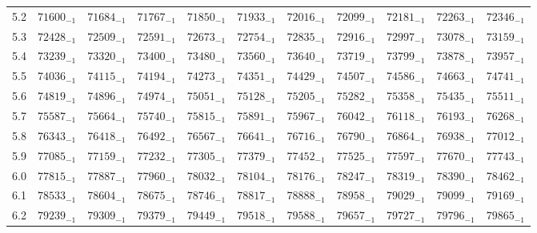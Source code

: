 \documentclass[10pt, a4paper]{article}
\begin{document}
\begin{center}
\begin{longtable}{c || c c c c c | c c c c c}
        5.2 & \({71600}_{-1}\) & \({71684}_{-1}\) & \({71767}_{-1}\) & \({71850}_{-1}\) & \({71933}_{-1}\) & \({72016}_{-1}\) & \({72099}_{-1}\) & \({72181}_{-1}\) & \({72263}_{-1}\) & \({72346}_{-1}\)\\
        5.3 & \({72428}_{-1}\) & \({72509}_{-1}\) & \({72591}_{-1}\) & \({72673}_{-1}\) & \({72754}_{-1}\) & \({72835}_{-1}\) & \({72916}_{-1}\) & \({72997}_{-1}\) & \({73078}_{-1}\) & \({73159}_{-1}\)\\
        5.4 & \({73239}_{-1}\) & \({73320}_{-1}\) & \({73400}_{-1}\) & \({73480}_{-1}\) & \({73560}_{-1}\) & \({73640}_{-1}\) & \({73719}_{-1}\) & \({73799}_{-1}\) & \({73878}_{-1}\) & \({73957}_{-1}\)\\
        5.5 & \({74036}_{-1}\) & \({74115}_{-1}\) & \({74194}_{-1}\) & \({74273}_{-1}\) & \({74351}_{-1}\) & \({74429}_{-1}\) & \({74507}_{-1}\) & \({74586}_{-1}\) & \({74663}_{-1}\) & \({74741}_{-1}\)\\
        5.6 & \({74819}_{-1}\) & \({74896}_{-1}\) & \({74974}_{-1}\) & \({75051}_{-1}\) & \({75128}_{-1}\) & \({75205}_{-1}\) & \({75282}_{-1}\) & \({75358}_{-1}\) & \({75435}_{-1}\) & \({75511}_{-1}\)\\
        5.7 & \({75587}_{-1}\) & \({75664}_{-1}\) & \({75740}_{-1}\) & \({75815}_{-1}\) & \({75891}_{-1}\) & \({75967}_{-1}\) & \({76042}_{-1}\) & \({76118}_{-1}\) & \({76193}_{-1}\) & \({76268}_{-1}\)\\
        5.8 & \({76343}_{-1}\) & \({76418}_{-1}\) & \({76492}_{-1}\) & \({76567}_{-1}\) & \({76641}_{-1}\) & \({76716}_{-1}\) & \({76790}_{-1}\) & \({76864}_{-1}\) & \({76938}_{-1}\) & \({77012}_{-1}\)\\
        5.9 & \({77085}_{-1}\) & \({77159}_{-1}\) & \({77232}_{-1}\) & \({77305}_{-1}\) & \({77379}_{-1}\) & \({77452}_{-1}\) & \({77525}_{-1}\) & \({77597}_{-1}\) & \({77670}_{-1}\) & \({77743}_{-1}\)\\
        \hline
        6.0 & \({77815}_{-1}\) & \({77887}_{-1}\) & \({77960}_{-1}\) & \({78032}_{-1}\) & \({78104}_{-1}\) & \({78176}_{-1}\) & \({78247}_{-1}\) & \({78319}_{-1}\) & \({78390}_{-1}\) & \({78462}_{-1}\)\\
        6.1 & \({78533}_{-1}\) & \({78604}_{-1}\) & \({78675}_{-1}\) & \({78746}_{-1}\) & \({78817}_{-1}\) & \({78888}_{-1}\) & \({78958}_{-1}\) & \({79029}_{-1}\) & \({79099}_{-1}\) & \({79169}_{-1}\)\\
        6.2 & \({79239}_{-1}\) & \({79309}_{-1}\) & \({79379}_{-1}\) & \({79449}_{-1}\) & \({79518}_{-1}\) & \({79588}_{-1}\) & \({79657}_{-1}\) & \({79727}_{-1}\) & \({79796}_{-1}\) & \({79865}_{-1}\)\\

\end{longtable}
\end{center}
\end{document}
